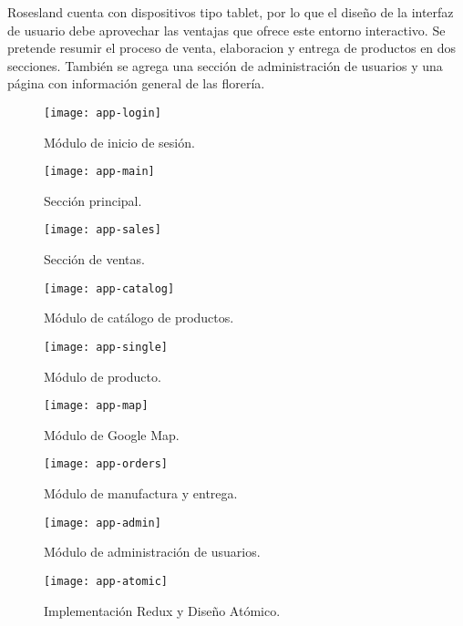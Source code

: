 Rosesland cuenta con dispositivos tipo tablet, por lo que el diseño de la interfaz de usuario debe aprovechar las ventajas que ofrece este entorno interactivo. Se pretende resumir el proceso de venta, elaboracion y entrega de productos en dos secciones. También se agrega una sección de administración de usuarios y una página con información general de las florería.
\vspace{0.8cm}

\begin{figure}[H]
  \centering
  \texttt{[image: app-login]}
  \caption{Módulo de inicio de sesión.}
\end{figure}
\vspace{0.8cm}

\begin{figure}[H]
  \centering
  \texttt{[image: app-main]}
  \caption{Sección principal.}
\end{figure}
\vspace{0.8cm}

\begin{figure}[H]
  \centering
  \texttt{[image: app-sales]}
  \caption{Sección de ventas.}
\end{figure}
\vspace{0.8cm}

\begin{figure}[H]
  \centering
  \texttt{[image: app-catalog]}
  \caption{Módulo de catálogo de productos.}
\end{figure}
\vspace{0.8cm}

\begin{figure}[H]
  \centering
  \texttt{[image: app-single]}
  \caption{Módulo de producto.}
\end{figure}
\vspace{0.8cm}

\begin{figure}[H]
  \centering
  \texttt{[image: app-map]}
  \caption{Módulo de Google Map.}
\end{figure}
\vspace{0.8cm}

\begin{figure}[H]
  \centering
  \texttt{[image: app-orders]}
  \caption{Módulo de manufactura y entrega.}
\end{figure}
\vspace{0.8cm}

\begin{figure}[H]
  \centering
  \texttt{[image: app-admin]}
  \caption{Módulo de administración de usuarios.}
\end{figure}
\vspace{0.8cm}

\begin{figure}[H]
  \centering
  \texttt{[image: app-atomic]}
  \caption{Implementación Redux y Diseño Atómico.}
\end{figure}
\vspace{0.8cm}